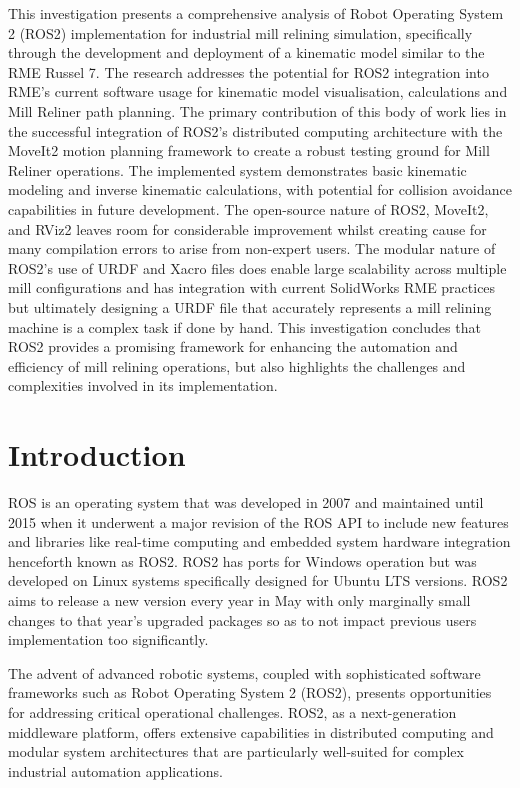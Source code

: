 \documentclass[10pt,a4paper,english]{article}
\begin{document}
This investigation presents a comprehensive analysis of Robot Operating System 2 (ROS2) implementation for industrial mill relining simulation, specifically through the development and deployment of a kinematic model similar to the RME Russel 7. The research addresses the potential for ROS2 integration into RME's current software usage for kinematic model visualisation, calculations and Mill Reliner path planning. The primary contribution of this body of work lies in the successful integration of ROS2's distributed computing architecture with the MoveIt2 motion planning framework to create a robust testing ground for Mill Reliner operations. The implemented system demonstrates basic kinematic modeling and inverse kinematic calculations, with potential for collision avoidance capabilities in future development. The open-source nature of ROS2, MoveIt2, and RViz2 leaves room for considerable improvement whilst creating cause for many compilation errors to arise from non-expert users. The modular nature of ROS2's use of URDF and Xacro files does enable large scalability across multiple mill configurations and has integration with current SolidWorks RME practices but ultimately designing a URDF file that accurately represents a mill relining machine is a complex task if done by hand. This investigation concludes that ROS2 provides a promising framework for enhancing the automation and efficiency of mill relining operations, but also highlights the challenges and complexities involved in its implementation.


\section{Introduction}
ROS is an operating system that was developed in 2007 and maintained until 2015 when it underwent a major revision of the ROS API to include new features and libraries like real-time computing and embedded system hardware integration henceforth known as ROS2. ROS2 has ports for Windows operation but was developed on Linux systems specifically designed for Ubuntu LTS versions. ROS2 aims to release a new version every year in May with only marginally small changes to that year's upgraded packages so as to not impact previous users implementation too significantly. \par

The advent of advanced robotic systems, coupled with sophisticated software frameworks such as Robot Operating System 2 (ROS2), presents opportunities for addressing critical operational challenges. ROS2, as a next-generation middleware platform, offers extensive capabilities in distributed computing and modular system architectures that are particularly well-suited for complex industrial automation applications. \par
\end{document}

